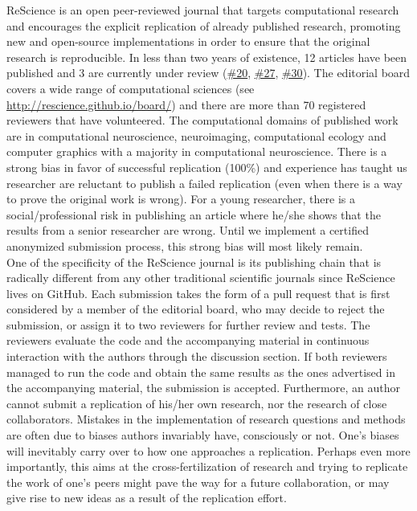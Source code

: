 \documentclass[a4paper,10pt, twocolumn]{article}
\begin{document}
ReScience is an open peer-reviewed journal that targets computational research
and encourages the explicit replication of already published research,
promoting new and open-source implementations in order to ensure that the
original research is reproducible. In less than two years of existence, 12
articles have been published and 3 are currently under review
(\href{https://github.com/ReScience/ReScience-submission/pull/20}{\#20},
\href{https://github.com/ReScience/ReScience-submission/pull/27}{\#27},
\href{https://github.com/ReScience/ReScience-submission/pull/30}{\#30}). The
editorial board covers a wide range of computational sciences (see
\url{http://rescience.github.io/board/}) and there are more than 70 registered
reviewers that have volunteered. The computational domains of published work
are in computational neuroscience, neuroimaging, computational ecology and
computer graphics with a majority in computational neuroscience. There is a
strong bias in favor of successful replication (100\%) and experience has
taught us researcher are reluctant to publish a failed replication (even when
there is a way to prove the original work is wrong). For a young researcher,
there is a social/professional risk in publishing an article where he/she shows
that the results from a senior researcher are wrong. Until we implement a
certified anonymized submission process, this strong bias will most likely
remain.\\

One of the specificity of the ReScience journal is its publishing chain that is
radically different from any other traditional scientific journals since
ReScience lives on GitHub. Each submission takes the form of a pull request
that is first considered by a member of the editorial board, who may decide to
reject the submission, or assign it to two reviewers for further review and
tests. The reviewers evaluate the code and the accompanying material in
continuous interaction with the authors through the discussion section. If both
reviewers managed to run the code and obtain the same results as the ones
advertised in the accompanying material, the submission is
accepted. Furthermore, an author cannot submit a replication of his/her own
research, nor the research of close collaborators. Mistakes in the
implementation of research questions and methods are often due to biases
authors invariably have, consciously or not. One's biases will inevitably carry
over to how one approaches a replication. Perhaps even more importantly, this
aims at the cross-fertilization of research and trying to replicate the work of
one’s peers might pave the way for a future collaboration, or may give rise to
new ideas as a result of the replication effort.\\
\end{document}
